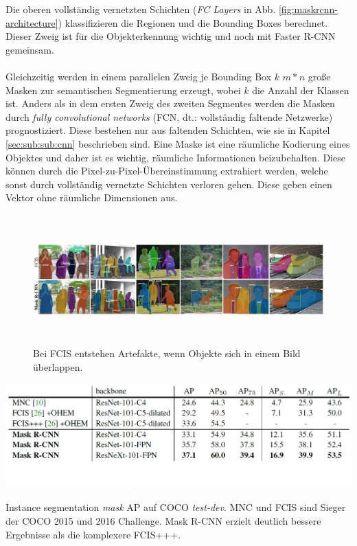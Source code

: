 \noindent
Die oberen vollständig vernetzten Schichten (\textit{FC Layers} in Abb. \ref{fig:maskrcnn-architecture}) klassifizieren die Regionen und die Bounding Boxes berechnet. Dieser Zweig ist für die Objekterkennung wichtig und noch mit Faster R-CNN gemeinsam. 
\\\\
Gleichzeitig werden in einem parallelen Zweig je Bounding Box $k$ $m*n$ große Masken zur semantischen Segmentierung erzeugt, wobei $k$ die Anzahl der Klassen ist. Anders als in dem ersten Zweig des zweiten Segmentes werden die Masken durch \textit{fully convolutional networks} (FCN, dt.: vollständig faltende Netzwerke) prognostiziert. Diese bestehen nur aus faltenden Schichten, wie sie in Kapitel \ref{sec:sub:sub:cnn} beschrieben sind. Eine Maske ist eine räumliche Kodierung eines Objektes und daher ist es wichtig, räumliche Informationen beizubehalten. Diese können durch die Pixel-zu-Pixel-Übereinstimmung extrahiert werden, welche sonst durch vollständig vernetzte Schichten verloren gehen. Diese geben einen Vektor ohne räumliche Dimensionen aus.\cite[S. 3]{ref:maskrcnn}
\\
\begin{figure}[ht]
  \centering
  \includegraphics[width=\textwidth, height=5cm]{pics/mrcnn-vs-fcis.PNG}
  \caption[Mask R-CNN vs. FCIS]{Bei FCIS entstehen Artefakte, wenn Objekte sich in einem Bild überlappen.\cite[S. 6]{ref:maskrcnn}}
  \label{fig:maskvsfcis}
\end{figure}
\begin{table}[ht]
  \centering
  \includegraphics[width=\textwidth]{pics/mrcnn-vs-fcis-vs-mnc.PNG}
  \caption[Mask R-CNN im Vergleich]{Instance segmentation \textit{mask} AP auf COCO \textit{test-dev}. MNC und FCIS sind Sieger der COCO 2015 und 2016 Challenge. Mask R-CNN erzielt deutlich bessere Ergebnisse als die komplexere FCIS+++.\cite[S. 6]{ref:maskrcnn}}
  \label{tab:maskvsfcisvsmnc}
\end{table}


